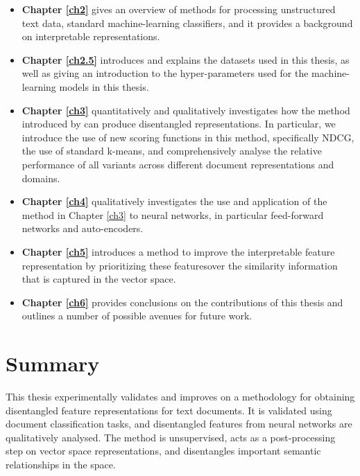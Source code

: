 \begin{itemize}
	\item \textbf{Chapter \ref{ch2}} gives an overview of methods for processing unstructured text data, standard machine-learning classifiers, and it provides a background on interpretable representations.
	\item \textbf{Chapter \ref{ch2.5}} introduces and explains the datasets used in this thesis, as well as giving an introduction to the hyper-parameters  used for the machine-learning models in this thesis.
	\item \textbf{Chapter \ref{ch3}} quantitatively and qualitatively investigates how the method introduced by \cite{Derrac2015} can produce disentangled representations. In particular, we introduce the use of new scoring functions in this method, specifically NDCG, the use of standard k-means,  and comprehensively analyse the relative performance of all variants across different document representations and domains. 
	\item \textbf{Chapter \ref{ch4}} qualitatively investigates the use and application of the method in Chapter \ref{ch3} to neural networks, in particular feed-forward networks and auto-encoders.
	\item \textbf{Chapter \ref{ch5}} introduces a  method to improve the interpretable feature representation by prioritizing these featuresover the similarity information that is captured in the vector space.
	\item \textbf{Chapter \ref{ch6}} provides conclusions on the contributions of this thesis and outlines a number of possible avenues for future work.
\end{itemize}


\section{Summary}

This thesis experimentally validates and improves on a methodology for obtaining disentangled feature representations for text documents. It is validated using document classification tasks, and disentangled features from neural networks are  qualitatively  analysed. The method is unsupervised, acts as a post-processing step on vector space representations, and  disentangles important semantic relationships in the space.  



